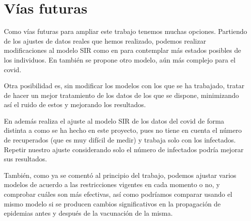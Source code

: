 \section{Vías futuras}

Como vías futuras para ampliar este trabajo tenemos muchas opciones. Partiendo de los ajustes de datos reales que hemos realizado, podemos realizar modificaciones al modelo SIR como en \cite{gutierrez2020analisis} para contemplar más estados posibles de los individuos. En \cite{RAMOS2021105937} también se propone otro modelo, aún más complejo para el covid.

Otra posibilidad es, sin modificar los modelos con los que se ha trabajado, tratar de hacer un mejor tratamiento de los datos de los que se dispone, minimizando así el ruido de estos y mejorando los resultados.

En \cite{enrique_amaro} además realiza el ajuste al modelo SIR de los datos del covid de forma distinta a como se ha hecho en este proyecto, pues no tiene en cuenta el número de recuperados (que es muy difícil de medir) y trabaja solo con los infectados. Repetir nuestro ajuste considerando solo el número de infectados podría mejorar sus resultados.

También, como ya se comentó al principio del trabajo, podemos ajustar varios modelos de acuerdo a las restricciones vigentes en cada momento o no, y comprobar cuáles son más efectivas, así como podríamos comparar usando el mismo modelo si se producen cambios significativos en la propagación de epidemias antes y después de la vacunación de la misma.









